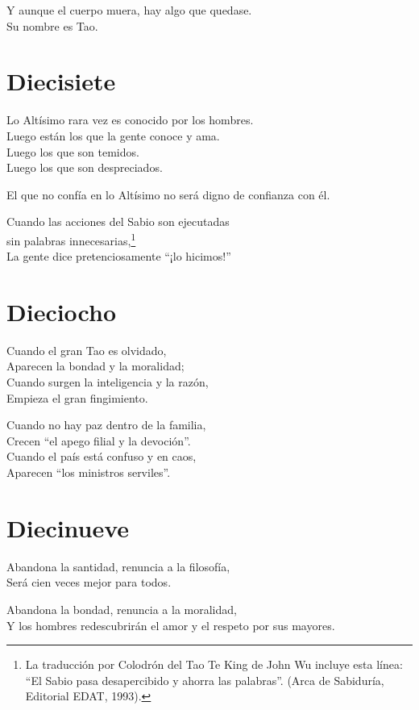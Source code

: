 \documentclass[book,b5paper,hidelinks,final]{memoir}
\begin{document}
	Y aunque el cuerpo muera, hay algo que quedase.\\
	Su nombre es Tao.
	
	\chapter*{Diecisiete}
	
	Lo Altísimo rara vez es conocido por los hombres.\\
	Luego están los que la gente conoce y ama.\\
	Luego los que son temidos.\\
	Luego los que son despreciados.
	
	El que no confía en lo Altísimo no será digno de confianza con él.
	
	Cuando las acciones del Sabio son ejecutadas\\
	sin palabras innecesarias,\footnote{La traducción por Colodrón del Tao Te King de John Wu incluye esta
		línea: ``El Sabio pasa desapercibido y ahorra las palabras''. (Arca de
		Sabiduría, Editorial EDAT, 1993).}\\
	La gente dice pretenciosamente ``¡lo hicimos!''
	
	\chapter*{Dieciocho}
	
	Cuando el gran Tao es olvidado,\\
	Aparecen la bondad y la moralidad;\\
	Cuando surgen la inteligencia y la razón,\\
	Empieza el gran fingimiento.
	
	Cuando no hay paz dentro de la familia,\\
	Crecen ``el apego filial y la devoción''.\\
	Cuando el país está confuso y en caos,\\
	Aparecen ``los ministros serviles''.
	
	\chapter*{Diecinueve}
	
	Abandona la santidad, renuncia a la filosofía,\\
	Será cien veces mejor para todos.
	
	Abandona la bondad, renuncia a la moralidad,\\
	Y los hombres redescubrirán el amor y el respeto por sus mayores.
	
\end{document}
